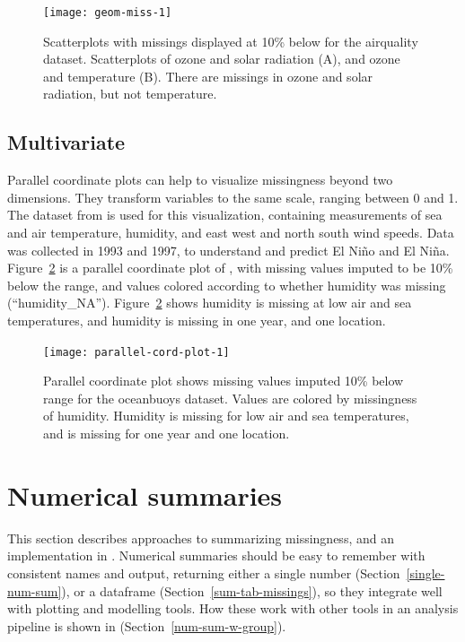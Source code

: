 \documentclass[article]{jss}
\begin{document}
\begin{figure}[t!]
\centering
\texttt{[image: geom-miss-1]}
\caption[Scatterplots with missings displayed at 10\% below for the
airquality dataset]{Scatterplots with missings displayed at 10\% below
for the airquality dataset.  Scatterplots of ozone and solar radiation (A),
and ozone and temperature (B).  There are missings in ozone and solar
radiation, but not temperature.}\label{fig:geom-miss}
\end{figure}

\hypertarget{multivariate}{%
\subsection{Multivariate}\label{multivariate}}

Parallel coordinate plots can help to visualize missingness beyond two
dimensions.  They transform variables to the same scale, ranging between 0
and 1.  The  dataset from  is used for this
visualization, containing measurements of sea and air temperature, humidity,
and east west and north south wind speeds.  Data was collected in 1993 and
1997, to understand and predict El Ni{\~n}o and El Ni{\~n}a.
Figure~\ref{fig:parallel-cord-plot} is a parallel coordinate plot of
, with missing values imputed to be 10\% below the range,
and values colored according to whether humidity was missing
(``humidity\_NA'').  Figure~\ref{fig:parallel-cord-plot} shows humidity is
missing at low air and sea temperatures, and humidity is missing in one
year, and one location.

\begin{figure}
\centering
\texttt{[image: parallel-cord-plot-1]}
\caption[Parallel coordinate plot shows missing values imputed 10\% below
range for the oceanbuoys dataset]{Parallel coordinate plot shows missing
values imputed 10\% below range for the oceanbuoys dataset.  Values are
colored by missingness of humidity.  Humidity is missing for low air and sea
temperatures, and is missing for one year and one
location.}\label{fig:parallel-cord-plot}
\end{figure}

\hypertarget{num-sum}{%
\section{Numerical summaries}\label{num-sum}}

This section describes approaches to summarizing missingness, and an
implementation in .  Numerical summaries should be easy to
remember with consistent names and output, returning either a single
number (Section~\ref{single-num-sum}), or a dataframe (Section~\ref{sum-tab-missings}),
so they integrate well with plotting and modelling tools.  How these work with other
tools in an analysis pipeline is shown in (Section~\ref{num-sum-w-group}).
\end{document}
